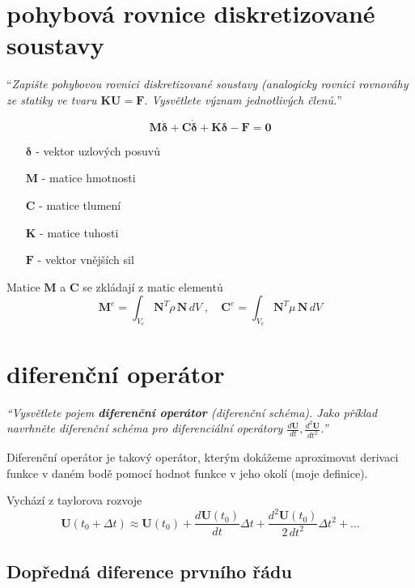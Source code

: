 \documentclass{article}
\begin{document}
	\begin{multicols}{2}
	
	\section{pohybová rovnice diskretizované soustavy}
	``\emph{Zapište pohybovou rovnici diskretizované soustavy (analogicky rovnici rovnováhy ze statiky ve tvaru $\bm{K}\bm{U} = \bm{F}$. Vysvětlete význam jednotlivých členů.}''

	\begin{equation*}
		\bm{M}\bm{\ddot{\delta}} + \bm{C}\bm{\dot{\delta}} + \bm{K}\bm{\delta} - \bm{F} = \bm{0}
	\end{equation*}
	\begin{itemize}
		\item [$\bm{\delta}$] - vektor uzlových posuvů
		\item [$\bm{M}$] - matice hmotnosti
		\item [$\bm{C}$] - matice tlumení
		\item [$\bm{K}$] - matice tuhosti
		\item [$\bm{F}$] - vektor vnějších sil
	\end{itemize}
	Matice $\bm{M}$ a $\bm{C}$ se zkládají z matic elementů
	\begin{equation*}
		\bm{M}^e = \int_{V_e} \bm{N}^T \rho \, \bm{N} \, dV
		\;,\quad 
		\bm{C}^e = \int_{V_e} \bm{N}^T \mu \, \bm{N} \, dV
	\end{equation*}

	\section{diferenční operátor}
	\emph{``Vysvětlete pojem \textbf{diferenční operátor} (diferenční schéma). Jako příklad navrhněte diferenční schéma pro diferenciální operátory $\frac{d\bm{U}}{dt},\frac{d^2\bm{U}}{dt^2}$.''}

	Diferenční operátor je takový operátor, kterým dokážeme aproximovat derivaci funkce v daném bodě pomocí hodnot funkce v jeho okolí (moje definice).
	
	Vychází z taylorova rozvoje
	\begin{equation*}
		\bm{U}(t_0+\Delta t) \approx \bm{U}(t_0) + \frac{d\bm{U}(t_0)}{dt} \Delta t + \frac{d^2\bm{U}(t_0)}{2\,dt^2} \Delta t^2 + \dots
	\end{equation*}
	
	\subsection{Dopředná diference prvního řádu}
	

\end{multicols}
\end{document}
